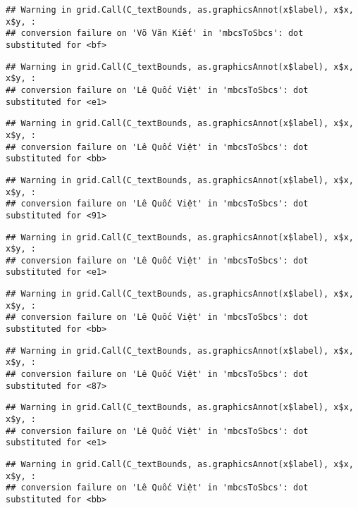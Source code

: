 \documentclass[
]{article}
\begin{document}
\begin{verbatim}
## Warning in grid.Call(C_textBounds, as.graphicsAnnot(x$label), x$x, x$y, :
## conversion failure on 'Võ Văn Kiết' in 'mbcsToSbcs': dot substituted for <bf>
\end{verbatim}

\begin{verbatim}
## Warning in grid.Call(C_textBounds, as.graphicsAnnot(x$label), x$x, x$y, :
## conversion failure on 'Lê Quốc Việt' in 'mbcsToSbcs': dot substituted for <e1>
\end{verbatim}

\begin{verbatim}
## Warning in grid.Call(C_textBounds, as.graphicsAnnot(x$label), x$x, x$y, :
## conversion failure on 'Lê Quốc Việt' in 'mbcsToSbcs': dot substituted for <bb>
\end{verbatim}

\begin{verbatim}
## Warning in grid.Call(C_textBounds, as.graphicsAnnot(x$label), x$x, x$y, :
## conversion failure on 'Lê Quốc Việt' in 'mbcsToSbcs': dot substituted for <91>
\end{verbatim}

\begin{verbatim}
## Warning in grid.Call(C_textBounds, as.graphicsAnnot(x$label), x$x, x$y, :
## conversion failure on 'Lê Quốc Việt' in 'mbcsToSbcs': dot substituted for <e1>
\end{verbatim}

\begin{verbatim}
## Warning in grid.Call(C_textBounds, as.graphicsAnnot(x$label), x$x, x$y, :
## conversion failure on 'Lê Quốc Việt' in 'mbcsToSbcs': dot substituted for <bb>
\end{verbatim}

\begin{verbatim}
## Warning in grid.Call(C_textBounds, as.graphicsAnnot(x$label), x$x, x$y, :
## conversion failure on 'Lê Quốc Việt' in 'mbcsToSbcs': dot substituted for <87>
\end{verbatim}

\begin{verbatim}
## Warning in grid.Call(C_textBounds, as.graphicsAnnot(x$label), x$x, x$y, :
## conversion failure on 'Lê Quốc Việt' in 'mbcsToSbcs': dot substituted for <e1>
\end{verbatim}

\begin{verbatim}
## Warning in grid.Call(C_textBounds, as.graphicsAnnot(x$label), x$x, x$y, :
## conversion failure on 'Lê Quốc Việt' in 'mbcsToSbcs': dot substituted for <bb>
\end{verbatim}
\end{document}
